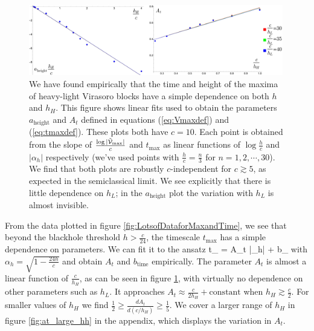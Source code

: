 \begin{figure}[h]
\begin{centering}
\includegraphics[width=0.99\textwidth]{virasoro_chapter/aparameterfits}
	\caption{ We have found empirically that the time and height of the maxima of heavy-light Virasoro blocks have a simple dependence on both $h$ and $h_H$.  This figure shows linear fits used to obtain the parameters $a_{\text{height}}$ and $A_t$ defined in equations (\ref{eq:Vmaxdef}) and (\ref{eq:tmaxdef}).  These plots both have $c=10$. Each point is obtained from the slope of $\frac{\log|\tilde{{\cal V}}_\text{max}|}{c}$ and $t_{\max}$ as linear functions of $\log \frac{h}{c}$ and $|\alpha_h|$ respectively (we've used points with $\frac{h}{c} = \frac{n}{3}$ for $n = 1, 2, \cdots, 30$).  We find that both plots are robustly $c$-independent for $c \gtrsim 5$, as expected in the semiclassical limit.  We see explicitly that there is little dependence on $h_L$; in the $a_{\text{height}}$ plot the variation with $h_L$ is almost invisible. }
\label{fig:aparameterfits}
\end{centering}
\end{figure}


From the data plotted in figure \ref{fig:LotsofDataforMaxandTime}, we see that beyond the blackhole threshold $h > \frac{c}{24}$, the timescale $t_{\text{max}}$ has a simple dependence on parameters.  We can fit it to the ansatz 
\be \label{eq:tmaxdef}
t_{} = A_t  |\alpha_h| + b_{}
\ee
with $\alpha_h=\sqrt{1-\frac{24h}{c}}$ and obtain $A_t$ and $b_{\text{time}}$ empirically.  The parameter $A_t$ is almost a linear function of $\frac{c}{h_H}$, as can be seen in figure \ref{fig:aparameterfits}, with virtually no dependence on other parameters such as $h_L$. It approaches $A_t \approx \frac{c}{2h_H}+\text{constant}$ when $h_H \gtrsim \frac{c}{2}$.  For smaller values of $h_H$ we find  $\frac{1}{2} \geq \frac{d A_t}{d(c/h_H)} \geq \frac{1}{5}$.    We cover a larger range of $h_H$ in figure \ref{fig:at_large_hh} in the appendix, which displays the variation in $A_t$.

